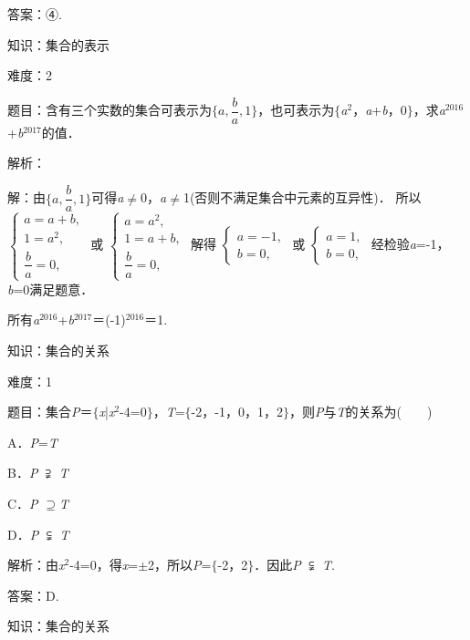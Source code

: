 \documentclass{article} %
\begin{document}
答案：④.

知识：集合的表示

难度：2

题目：含有三个实数的集合可表示为$\mathrm{\{}a,\dfrac{b}{a},1\mathrm{\}}$，也可表示为$\mathrm{\{}$\textit{a}${}^{2}$，\textit{a}+\textit{b}，0$\mathrm{\}}$，求\textit{a}${}^{2016}$+\textit{b}${}^{2017}$的值．

解析：

解：由$\mathrm{\{}a,\dfrac{b}{a},1\mathrm{\}}$可得\textit{a}$\mathrm{\neq}$0，\textit{a}$\mathrm{\neq}$1(否则不满足集合中元素的互异性)．
所以
$\left\{
\begin{array}{l}
a=a+b,\\
1=a^{2},\\
\dfrac{b}{a}=0,
\end{array}
\right.$
或
$\left\{
\begin{array}{l}
a=a^{2},\\
1=a+b,\\
\dfrac{b}{a}=0,
\end{array}
\right.$
解得
$\left\{
\begin{array}{l}
a=-1,\\
b=0,
\end{array}
\right.$
或
$\left\{
\begin{array}{l}
a=1,\\
b=0,
\end{array}
\right.$
经检验\textit{a}=-1，\textit{b}=0满足题意．

所有\textit{a}${}^{2016}$+\textit{b}${}^{2017}$＝(-1)${}^{2016}$＝1.


知识：集合的关系

难度：1

题目：集合\textit{P}＝$\mathrm{\{}$\textit{x}|\textit{x}${}^{2}$-4=0$\mathrm{\}}$，\textit{T}=$\mathrm{\{}$-2，-1，0，1，2$\mathrm{\}}$，则\textit{P}与\textit{T}的关系为(　　)

A．\textit{P}=\textit{T}　　　　　　　 

B．\textit{P} $\supsetneqq$ \textit{T}

C．\textit{P} $\mathrm{\supseteq}$\textit{T}   

D．\textit{P} $\subsetneqq$ \textit{T}

解析：由\textit{x}${}^{2}$-4=0，得\textit{x}=$\mathrm{\pm}$2，所以\textit{P}=$\mathrm{\{}$-2，2$\mathrm{\}}$．因此\textit{P} $\subsetneqq$ \textit{T}.

答案：D.

知识：集合的关系
\end{document}
